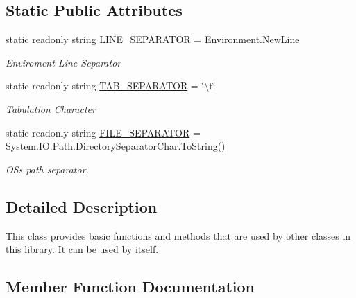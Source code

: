 \subsection*{Static Public Attributes}
\begin{DoxyCompactItemize}
\item 
static readonly string \mbox{\hyperlink{class_engine_1_1_base_1_1_general_a7e3aae6329f0bdfb6cba31f22209f89a}{L\+I\+N\+E\+\_\+\+S\+E\+P\+A\+R\+A\+T\+OR}} = Environment.\+New\+Line
\begin{DoxyCompactList}\small\item\em Enviroment Line Separator \end{DoxyCompactList}\item 
static readonly string \mbox{\hyperlink{class_engine_1_1_base_1_1_general_ac5bccbcf57593e512ba8a61842472eeb}{T\+A\+B\+\_\+\+S\+E\+P\+A\+R\+A\+T\+OR}} = \char`\"{}\textbackslash{}t\char`\"{}
\begin{DoxyCompactList}\small\item\em Tabulation Character \end{DoxyCompactList}\item 
static readonly string \mbox{\hyperlink{class_engine_1_1_base_1_1_general_a36998d7536682a1ac6a3fe8a14f63674}{F\+I\+L\+E\+\_\+\+S\+E\+P\+A\+R\+A\+T\+OR}} = System.\+I\+O.\+Path.\+Directory\+Separator\+Char.\+To\+String()
\begin{DoxyCompactList}\small\item\em OS\textquotesingle{}s path separator. \end{DoxyCompactList}\end{DoxyCompactItemize}


\subsection{Detailed Description}
This class provides basic functions and methods that are used by other classes in this library. It can be used by itself. 



\subsection{Member Function Documentation}
\mbox{\label{class_engine_1_1_base_1_1_general_a2122b1dc3c6875bf580fe669a0f86d84}} 
